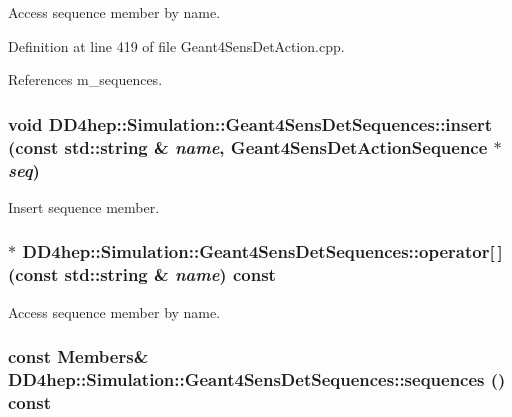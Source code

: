 Access sequence member by name. 

Definition at line 419 of file Geant4SensDetAction.cpp.

References m\_\-sequences.\hypertarget{class_d_d4hep_1_1_simulation_1_1_geant4_sens_det_sequences_a4ec3cfb93ef16c90a28f451c58711692}{
\subsubsection[{insert}]{\setlength{\rightskip}{0pt plus 5cm}void DD4hep::Simulation::Geant4SensDetSequences::insert (const std::string \& {\em name}, \/  {\bf Geant4SensDetActionSequence} $\ast$ {\em seq})}}
\label{class_d_d4hep_1_1_simulation_1_1_geant4_sens_det_sequences_a4ec3cfb93ef16c90a28f451c58711692}


Insert sequence member. \hypertarget{class_d_d4hep_1_1_simulation_1_1_geant4_sens_det_sequences_ac9ce2f754375eef699ff1a05c1759c03}{
\subsubsection[{operator[]}]{$\ast$ DD4hep::Simulation::Geant4SensDetSequences::operator\mbox{[}$\,$\mbox{]} (const std::string \& {\em name}) const}}
\label{class_d_d4hep_1_1_simulation_1_1_geant4_sens_det_sequences_ac9ce2f754375eef699ff1a05c1759c03}


Access sequence member by name. \hypertarget{class_d_d4hep_1_1_simulation_1_1_geant4_sens_det_sequences_aacde15e4b1fb60c1ed56f438bc92db9a}{
\subsubsection[{sequences}]{\setlength{\rightskip}{0pt plus 5cm}const {\bf Members}\& DD4hep::Simulation::Geant4SensDetSequences::sequences () const}}
\label{class_d_d4hep_1_1_simulation_1_1_geant4_sens_det_sequences_aacde15e4b1fb60c1ed56f438bc92db9a}


